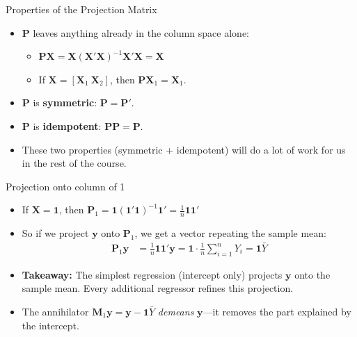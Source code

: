 \documentclass[aspectratio=169, handout]{beamer}
\numberwithin{equation}{section}
\begin{document}
\begin{frame}{Properties of the Projection Matrix}
\begin{itemize}
\item $\bm{P}$ leaves anything already in the column space alone:\pause
\begin{itemize}
\item $\bm{P}\bm{X}=\bm{X}(\bm{X}'\bm{X})^{-1}\bm{X}'\bm{X}=\bm{X}$
\item If $\bm{X}=[\bm{X}_1\ \bm{X}_2]$, then $\bm{P}\bm{X}_1=\bm{X}_1$.
\end{itemize}\pause
\item $\bm{P}$ is \textbf{symmetric}: $\bm{P}=\bm{P}'$.\pause
\item $\bm{P}$ is \textbf{idempotent}: $\bm{P}\bm{P}=\bm{P}$.
\pause
\item These two properties (symmetric + idempotent) will do a lot of work for us in the rest of the course.
\end{itemize}
\end{frame}





\begin{frame}{Projection onto column of 1}
\begin{itemize}
\item If $\bm{X}=\bm{1}$, then
$\bm{P}_1=\bm{1}(\bm{1}'\bm{1})^{-1}\bm{1}'=\frac{1}{n}\bm{1}\bm{1}'$
\item So if we project $\bm{y}$ onto $\bm{P}_1$, we get a vector repeating the sample mean:
\begin{align*}
\bm{P}_1\bm{y}&=\frac{1}{n}\bm{1}\bm{1}'\bm{y}=\bm{1}\cdot\frac{1}{n}\sum_{i=1}^nY_i=\bm{1}\bar{Y}
\end{align*}
\item \textbf{Takeaway:} The simplest regression (intercept only) projects $\bm{y}$ onto the sample mean. Every additional regressor refines this projection.
\item The annihilator $\bm{M}_1\bm{y}=\bm{y}-\bm{1}\bar{Y}$ \emph{demeans} $\bm{y}$---it removes the part explained by the intercept.
\end{itemize}
\end{frame}
\end{document}
